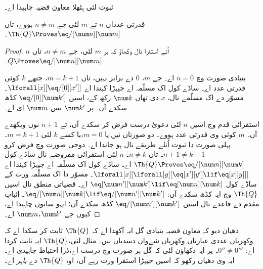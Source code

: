 \documentclass[../../../include/open-logic-section]{subfiles}
\begin{document}
ثبوت لئی ہِٹھلا معاون قضیہ چاہیدا اے۔

\begin{lem}
 قدرتی عدداں $n$ تے $m$ لئی جے $n \neq m$ ہووے، تاں $\Th{Q} \Proves \eq/[\num n][\num m]$۔
\end{lem}

\begin{proof}
$n$ اُتے استقرا نال وکھاؤ کہ ہر $m$ لئی، جے $n \neq m$، تاں $Q \Proves \eq/[\num n][\num m]$۔

بنیادی صورت وچ $n = 0$ اے۔ جے $m$، $0$ دے برابر نہیں، تاں
$m = k + 1$، جتھے $k$ کوئی قدرتی عدد اے۔ ساڈے کول اک مسلّمہ اے جیہڑا کہندا اے
$\lforall[x][\eq/[0][x']]$۔ مسوّر دے اک مسلّمے نال، $x$ دی تھاں $\num k$ رکھ کے، اسیں $\eq/[0][\num k']$ کڈھ سکدے آں۔
پر $\num k'$ بس $\num m$ ای اے۔

استقرائی قدم وچ اسیں $n$ لئی دعویٰ درست فرض کر سکدے آں،
تے $n+1$ نوں ویکھدے آں۔ $m$ کوئی وی قدرتی عدد ہووے۔ دو
صورتاں نیں:یا $m = 0$،یا کسے $k$ لئی $m = k+1$۔ پہلی صورت دا ثبوت اُتلے طریقے نال ہو جاندا اے۔ دوجی صورت وچ
فرض کرو $n+1 \neq
k+1$۔ تاں $n \neq k$۔ $n$ لئی استقرائی مفروضے نال ساڈے
کول $\Th{Q} \Proves \eq/[\num n][\num k]$ اے۔ ساڈے کول
اک مسلّمہ اے جیہڑا کہندا اے
$\lforall[x][\lforall[y][\eq[x'][y'] \lif \eq[x][y]]]$۔ مسوّر دا اک مسلّمہ ورت کے ساڈے کول
$\eq[\num n'][\num k'] \lif \eq[\num n][\num
  k]$ اے۔ قضیاتی منطق نال اسیں $\Th{Q}$ وچ ایہ کڈھ سکدے آں:
$\eq/[\num n][\num k] \lif \eq/[\num n'][\num k']$۔
اثباتِ مقدم دے قاعدے نال اسیں $\eq/[\num n'][\num k']$ کڈھ سکدے آں؛
ایہو سانوں چاہیدا اے، کیوں جے $\num k'$،$\num m$ اے۔
\end{proof}

\begin{explain}
دھیان دیو کہ معاون قضیہ بنیادی گل ایہ آکھدا اے کہ $\Th{Q}$ ثابت کر سکدا اے کہ وکھریاں
عددی عبارتاں وکھریاں شےواں دسدیاں نیں۔ مثال لئی،$\Th{Q}$
ایہ ثابت کردا اے: $0'' \neq 0'''$۔ پر ایہ دکھاؤن لئی کہ
گل ہر صورت وچ درست اے،ذرا احتیاط چاہیدی اے۔ ایہ وی دھیان رکھو کہ اسیں جیہڑا استقرا ورت رہے آں، اوہ
$\Th{Q}$ دے \emph{باہر} اے۔
\end{explain}
\end{document}

